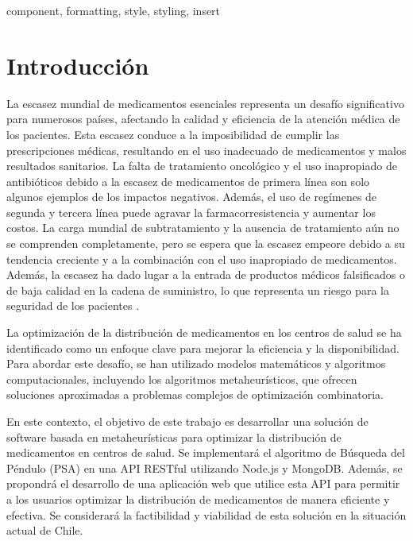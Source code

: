 \documentclass[conference]{IEEEtran}
\begin{document}
\begin{IEEEkeywords}
    component, formatting, style, styling, insert
\end{IEEEkeywords}

\section{Introducción}

La escasez mundial de medicamentos esenciales representa un desafío significativo para numerosos países, afectando la calidad y eficiencia de la atención médica de los pacientes. Esta escasez conduce a la imposibilidad de cumplir las prescripciones médicas, resultando en el uso inadecuado de medicamentos y malos resultados sanitarios. La falta de tratamiento oncológico y el uso inapropiado de antibióticos debido a la escasez de medicamentos de primera línea son solo algunos ejemplos de los impactos negativos. Además, el uso de regímenes de segunda y tercera línea puede agravar la farmacorresistencia y aumentar los costos. La carga mundial de subtratamiento y la ausencia de tratamiento aún no se comprenden completamente, pero se espera que la escasez empeore debido a su tendencia creciente y a la combinación con el uso inapropiado de medicamentos. Además, la escasez ha dado lugar a la entrada de productos médicos falsificados o de baja calidad en la cadena de suministro, lo que representa un riesgo para la seguridad de los pacientes \cite{OMS2016}.

La optimización de la distribución de medicamentos en los centros de salud se ha identificado como un enfoque clave para mejorar la eficiencia y la disponibilidad. Para abordar este desafío, se han utilizado modelos matemáticos y algoritmos computacionales, incluyendo los algoritmos metaheurísticos, que ofrecen soluciones aproximadas a problemas complejos de optimización combinatoria.

En este contexto, el objetivo de este trabajo es desarrollar una solución de software basada en metaheurísticas para optimizar la distribución de medicamentos en centros de salud. Se implementará el algoritmo de Búsqueda del Péndulo (PSA) en una API RESTful utilizando Node.js y MongoDB. Además, se propondrá el desarrollo de una aplicación web que utilice esta API para permitir a los usuarios optimizar la distribución de medicamentos de manera eficiente y efectiva. Se considerará la factibilidad y viabilidad de esta solución en la situación actual de Chile.
\end{document}
